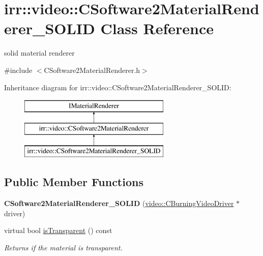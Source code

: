 \hypertarget{classirr_1_1video_1_1_c_software2_material_renderer___s_o_l_i_d}{\section{irr\-:\-:video\-:\-:C\-Software2\-Material\-Renderer\-\_\-\-S\-O\-L\-I\-D Class Reference}
\label{classirr_1_1video_1_1_c_software2_material_renderer___s_o_l_i_d}
}


solid material renderer  




{\ttfamily \#include $<$C\-Software2\-Material\-Renderer.\-h$>$}

Inheritance diagram for irr\-:\-:video\-:\-:C\-Software2\-Material\-Renderer\-\_\-\-S\-O\-L\-I\-D\-:\begin{figure}[H]
\begin{center}
\leavevmode
\includegraphics[height=3.000000cm]{classirr_1_1video_1_1_c_software2_material_renderer___s_o_l_i_d}
\end{center}
\end{figure}
\subsection*{Public Member Functions}
\begin{DoxyCompactItemize}
\item 
\hypertarget{classirr_1_1video_1_1_c_software2_material_renderer___s_o_l_i_d_a801cfa46c5d891a45c23ef31c47d57a1}{{\bfseries C\-Software2\-Material\-Renderer\-\_\-\-S\-O\-L\-I\-D} (\hyperlink{classirr_1_1video_1_1_c_burning_video_driver}{video\-::\-C\-Burning\-Video\-Driver} $\ast$driver)}\label{classirr_1_1video_1_1_c_software2_material_renderer___s_o_l_i_d_a801cfa46c5d891a45c23ef31c47d57a1}

\item 
\hypertarget{classirr_1_1video_1_1_c_software2_material_renderer___s_o_l_i_d_a9f23fdc43f764e04111ab29d08254f63}{virtual bool \hyperlink{classirr_1_1video_1_1_c_software2_material_renderer___s_o_l_i_d_a9f23fdc43f764e04111ab29d08254f63}{is\-Transparent} () const }\label{classirr_1_1video_1_1_c_software2_material_renderer___s_o_l_i_d_a9f23fdc43f764e04111ab29d08254f63}

\begin{DoxyCompactList}\small\item\em Returns if the material is transparent. \end{DoxyCompactList}\end{DoxyCompactItemize}
